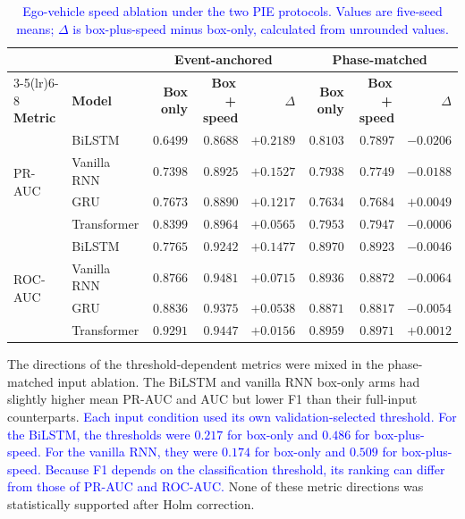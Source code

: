 \documentclass[mti,article,submit,moreauthors]{Definitions/mdpi}
\begin{document}
\begin{table}[htbp]
\centering
\caption{\textcolor{blue}{Ego-vehicle speed ablation under the two PIE protocols. Values are five-seed means; $\Delta$ is box-plus-speed minus box-only, calculated from unrounded values.}}
\label{tab:speed-phase}
\small
\setlength{\tabcolsep}{4pt}
\begin{tabular}{llrrrrrr}
\toprule
& & \multicolumn{3}{c}{\textbf{Event-anchored}} &
\multicolumn{3}{c}{\textbf{Phase-matched}} \\
\cmidrule(lr){3-5}\cmidrule(lr){6-8}
\textbf{Metric} & \textbf{Model} &
\textbf{Box only} & \textbf{Box\,+\,speed} & \textbf{$\Delta$} &
\textbf{Box only} & \textbf{Box\,+\,speed} & \textbf{$\Delta$} \\
\midrule
\multirow{4}{*}{PR-AUC}
 & BiLSTM      & $0.6499$ & $0.8688$ & $+0.2189$ & $0.8103$ & $0.7897$ & $-0.0206$ \\
 & Vanilla RNN & $0.7398$ & $0.8925$ & $+0.1527$ & $0.7938$ & $0.7749$ & $-0.0188$ \\
 & GRU         & $0.7673$ & $0.8890$ & $+0.1217$ & $0.7634$ & $0.7684$ & $+0.0049$ \\
 & Transformer & $0.8399$ & $0.8964$ & $+0.0565$ & $0.7953$ & $0.7947$ & $-0.0006$ \\
\midrule
\multirow{4}{*}{ROC-AUC}
 & BiLSTM      & $0.7765$ & $0.9242$ & $+0.1477$ & $0.8970$ & $0.8923$ & $-0.0046$ \\
 & Vanilla RNN & $0.8766$ & $0.9481$ & $+0.0715$ & $0.8936$ & $0.8872$ & $-0.0064$ \\
 & GRU         & $0.8836$ & $0.9375$ & $+0.0538$ & $0.8871$ & $0.8817$ & $-0.0054$ \\
 & Transformer & $0.9291$ & $0.9447$ & $+0.0156$ & $0.8959$ & $0.8971$ & $+0.0012$ \\
\bottomrule
\end{tabular}
\end{table}

The directions of the threshold-dependent metrics were mixed in the phase-matched input ablation. The BiLSTM and vanilla RNN box-only arms had slightly higher mean PR-AUC and AUC but lower F1 than their full-input counterparts. %
\textcolor{blue}{Each input condition used its own validation-selected threshold.
For the BiLSTM, the thresholds were $0.217$ for box-only and
$0.486$ for box-plus-speed. For the vanilla RNN, they were
$0.174$ for box-only and $0.509$ for box-plus-speed.
Because F1 depends on the classification threshold, its ranking
can differ from those of PR-AUC and ROC-AUC.} None of these metric directions was statistically supported after Holm correction.
\end{document}

